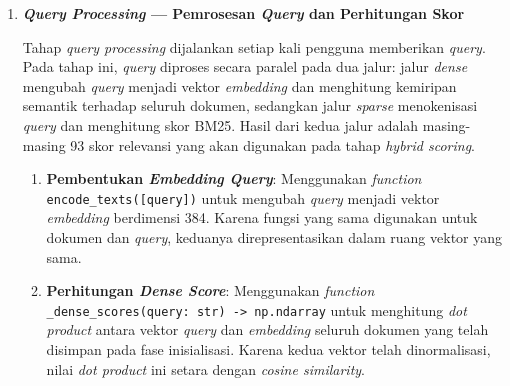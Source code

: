 \documentclass[12pt,a4paper]{article}
\begin{document}
\begin{enumerate}[leftmargin=1.1cm]
\begin{enumerate}[label=\alph*., leftmargin=1.1cm]
\item \textbf{\textit{Preprocessing} Teks untuk BM25}: Menggunakan \textit{function} \texttt{tokenize(text: str) -> list[str]} untuk mengubah teks dokumen menjadi daftar \textit{token}. Proses ini dilakukan dengan \textit{lowercase} dan pengambilan karakter alfanumerik menggunakan \textit{regex} \texttt{[A-Za-z0-9]+}.

\item \textbf{Pembangunan Indeks BM25}: Pada saat \texttt{BM25Retriever} diinisialisasi, seluruh representasi teks kontrol ISO diproses menggunakan \texttt{tokenize()}, kemudian sistem menghitung panjang dokumen (\texttt{doc\_lens}), \textit{document frequency} (\texttt{\_compute\_doc\_freq()}), dan \textit{inverse document frequency} menggunakan formula Okapi BM25, yaitu $\log(1 + (N - df + 0.5) / (df + 0.5))$. Indeks yang dihasilkan disimpan dalam memori dan siap digunakan pada tahap \textit{query processing}.
\end{enumerate}

\item \textbf{\textit{Query Processing} --- Pemrosesan \textit{Query} dan Perhitungan Skor}

Tahap \textit{query processing} dijalankan setiap kali pengguna memberikan \textit{query}. Pada tahap ini, \textit{query} diproses secara paralel pada dua jalur: jalur \textit{dense} mengubah \textit{query} menjadi vektor \textit{embedding} dan menghitung kemiripan semantik terhadap seluruh dokumen, sedangkan jalur \textit{sparse} menokenisasi \textit{query} dan menghitung skor BM25. Hasil dari kedua jalur adalah masing-masing 93 skor relevansi yang akan digunakan pada tahap \textit{hybrid scoring}.

\begin{enumerate}[label=\alph*., leftmargin=1.1cm]
\item \textbf{Pembentukan \textit{Embedding Query}}: Menggunakan \textit{function} \texttt{encode\_texts([query])} untuk mengubah \textit{query} menjadi vektor \textit{embedding} berdimensi 384. Karena fungsi yang sama digunakan untuk dokumen dan \textit{query}, keduanya direpresentasikan dalam ruang vektor yang sama.

\item \textbf{Perhitungan \textit{Dense Score}}: Menggunakan \textit{function} \texttt{\_dense\_scores(query: str) -> np.ndarray} untuk menghitung \textit{dot product} antara vektor \textit{query} dan \textit{embedding} seluruh dokumen yang telah disimpan pada fase inisialisasi. Karena kedua vektor telah dinormalisasi, nilai \textit{dot product} ini setara dengan \textit{cosine similarity}.


\end{enumerate}
\end{enumerate}
\end{document}
